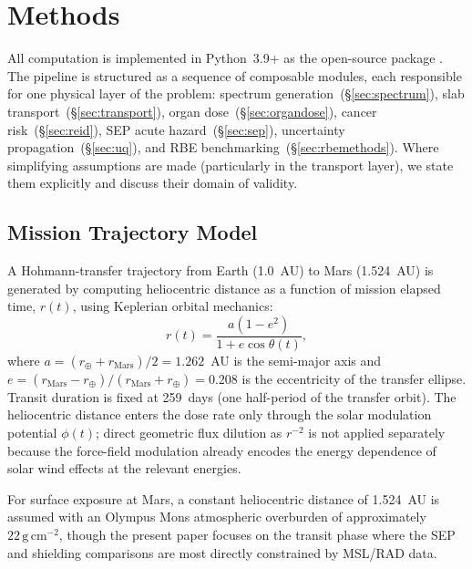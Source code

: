 
\section{Methods}
\label{sec:methods}

All computation is implemented in Python~3.9+ as the open-source package
.
The pipeline is structured as a sequence of composable modules, each responsible
for one physical layer of the problem:
spectrum generation~(\S\ref{sec:spectrum}),
slab transport~(\S\ref{sec:transport}),
organ dose~(\S\ref{sec:organdose}),
cancer risk~(\S\ref{sec:reid}),
SEP acute hazard~(\S\ref{sec:sep}),
uncertainty propagation~(\S\ref{sec:uq}),
and RBE benchmarking~(\S\ref{sec:rbemethods}).
Where simplifying assumptions are made (particularly in the transport
layer), we state them explicitly and discuss their domain of validity.

\subsection{Mission Trajectory Model}
\label{sec:trajectory}

A Hohmann-transfer trajectory from Earth (1.0~AU) to Mars (1.524~AU) is
generated by computing heliocentric distance as a function of mission elapsed
time, $r(t)$, using Keplerian orbital mechanics:
\begin{equation}
  r(t) = \frac{a(1-e^2)}{1 + e\cos\theta(t)},
  \label{eq:orbit}
\end{equation}
where $a = (r_\oplus + r_\mathrm{Mars})/2 = 1.262$~AU is the semi-major axis
and $e = (r_\mathrm{Mars} - r_\oplus)/(r_\mathrm{Mars} + r_\oplus) = 0.208$
is the eccentricity of the transfer ellipse.
Transit duration is fixed at 259~days (one half-period of the transfer orbit).
The heliocentric distance enters the dose rate only through the solar modulation
potential $\phi(t)$; direct geometric flux dilution as $r^{-2}$ is not applied
separately because the force-field modulation already encodes the energy
dependence of solar wind effects at the relevant energies.

For surface exposure at Mars, a constant heliocentric distance of 1.524~AU is
assumed with an Olympus Mons atmospheric overburden of approximately
$22\,\mathrm{g\,cm^{-2}}$, though the present paper focuses on the transit
phase where the SEP and shielding comparisons are most directly constrained
by MSL/RAD data.

